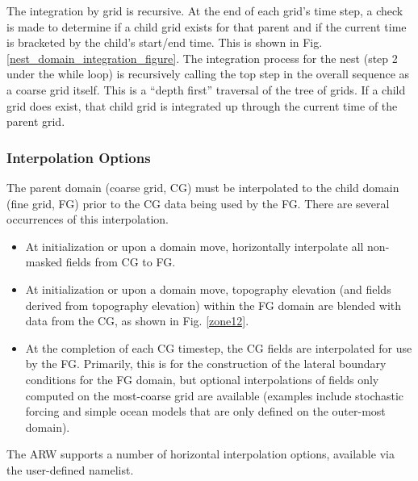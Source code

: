 The integration by grid is recursive.  At the end of each grid's time step, a check
is made to determine if a child grid exists for that parent and if the
current time is bracketed by the child's start/end time.  
This is shown in Fig. \ref{nest_domain_integration_figure}.  The integration process for the nest (step 2 under the
while loop) is recursively calling the top step in the overall sequence as a coarse grid itself.
This is a ``depth first'' 
traversal of the tree of grids.
If a child grid does exist, that child grid is integrated up through the current time of 
the parent grid.

\subsubsection{Interpolation Options}

The parent domain (coarse grid, CG) must be interpolated to the child domain 
(fine grid, FG) prior to the CG data being used by the FG. There are several 
occurrences of this interpolation.
\begin{itemize}\setlength{\parskip}{-4pt}
\item At initialization or upon a domain move, horizontally interpolate all 
non-masked fields from CG to FG.
\item At initialization or upon a domain move, topography elevation (and 
fields derived from topography elevation) within the FG domain are blended 
with data from the CG, as shown in Fig. \ref{zone12}.
\item At the completion of each CG timestep, the CG fields are interpolated
for use by the FG. Primarily, this is for the construction of the lateral boundary 
conditions for the FG domain, but optional interpolations of fields only computed 
on the most-coarse grid are available (examples include stochastic forcing and 
simple ocean models that are only defined on the outer-most domain).
\end{itemize}
\noindent 
The ARW supports a number of horizontal interpolation options, available via
the user-defined namelist.

